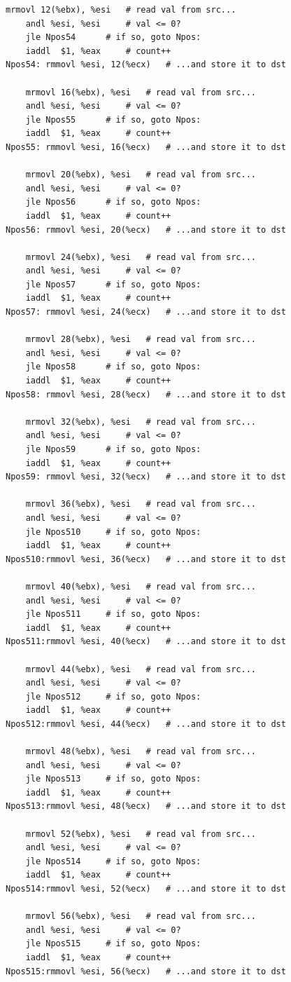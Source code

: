 \documentclass{article}
\begin{document}
\begin{itemize}
\begin{lstlisting}[caption={}]
	mrmovl 12(%ebx), %esi	# read val from src...
	andl %esi, %esi		# val <= 0?
	jle Npos54		# if so, goto Npos:
	iaddl  $1, %eax		# count++
Npos54:	rmmovl %esi, 12(%ecx)	# ...and store it to dst

	mrmovl 16(%ebx), %esi	# read val from src...
	andl %esi, %esi		# val <= 0?
	jle Npos55		# if so, goto Npos:
	iaddl  $1, %eax		# count++
Npos55:	rmmovl %esi, 16(%ecx)	# ...and store it to dst

	mrmovl 20(%ebx), %esi	# read val from src...
	andl %esi, %esi		# val <= 0?
	jle Npos56		# if so, goto Npos:
	iaddl  $1, %eax		# count++
Npos56:	rmmovl %esi, 20(%ecx)	# ...and store it to dst

	mrmovl 24(%ebx), %esi	# read val from src...
	andl %esi, %esi		# val <= 0?
	jle Npos57		# if so, goto Npos:
	iaddl  $1, %eax		# count++
Npos57:	rmmovl %esi, 24(%ecx)	# ...and store it to dst

	mrmovl 28(%ebx), %esi	# read val from src...
	andl %esi, %esi		# val <= 0?
	jle Npos58		# if so, goto Npos:
	iaddl  $1, %eax		# count++
Npos58:	rmmovl %esi, 28(%ecx)	# ...and store it to dst

	mrmovl 32(%ebx), %esi	# read val from src...
	andl %esi, %esi		# val <= 0?
	jle Npos59		# if so, goto Npos:
	iaddl  $1, %eax		# count++
Npos59:	rmmovl %esi, 32(%ecx)	# ...and store it to dst

	mrmovl 36(%ebx), %esi	# read val from src...
	andl %esi, %esi		# val <= 0?
	jle Npos510		# if so, goto Npos:
	iaddl  $1, %eax		# count++
Npos510:rmmovl %esi, 36(%ecx)	# ...and store it to dst

	mrmovl 40(%ebx), %esi	# read val from src...
	andl %esi, %esi		# val <= 0?
	jle Npos511		# if so, goto Npos:
	iaddl  $1, %eax		# count++
Npos511:rmmovl %esi, 40(%ecx)	# ...and store it to dst

	mrmovl 44(%ebx), %esi	# read val from src...
	andl %esi, %esi		# val <= 0?
	jle Npos512		# if so, goto Npos:
	iaddl  $1, %eax		# count++
Npos512:rmmovl %esi, 44(%ecx)	# ...and store it to dst

	mrmovl 48(%ebx), %esi	# read val from src...
	andl %esi, %esi		# val <= 0?
	jle Npos513		# if so, goto Npos:
	iaddl  $1, %eax		# count++
Npos513:rmmovl %esi, 48(%ecx)	# ...and store it to dst

	mrmovl 52(%ebx), %esi	# read val from src...
	andl %esi, %esi		# val <= 0?
	jle Npos514		# if so, goto Npos:
	iaddl  $1, %eax		# count++
Npos514:rmmovl %esi, 52(%ecx)	# ...and store it to dst

	mrmovl 56(%ebx), %esi	# read val from src...
	andl %esi, %esi		# val <= 0?
	jle Npos515		# if so, goto Npos:
	iaddl  $1, %eax		# count++
Npos515:rmmovl %esi, 56(%ecx)	# ...and store it to dst


\end{lstlisting}
\end{itemize}
\end{document}
